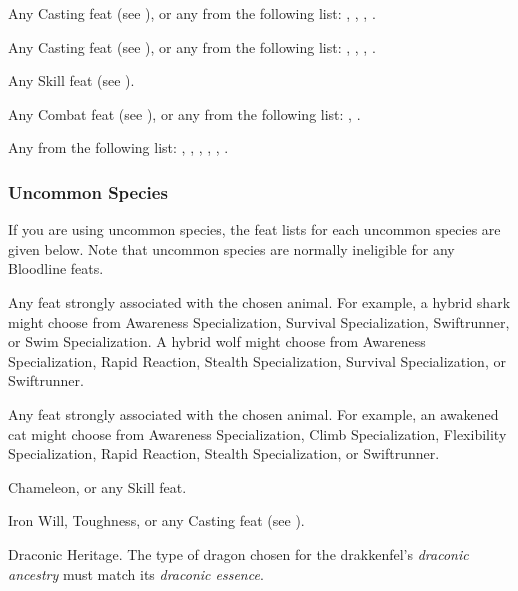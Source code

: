          Any Casting feat (see ), or any from the following list: , , , .

         Any Casting feat (see ), or any from the following list: , , , .

         Any Skill feat (see ).

         Any Combat feat (see ), or any from the following list: , .

         Any from the following list: , , , , , .

        \subsubsection{Uncommon Species}
            If you are using uncommon species, the feat lists for each uncommon species are given below.
            Note that uncommon species are normally ineligible for any Bloodline feats.

             Any feat strongly associated with the chosen animal. For example, a hybrid shark might choose from Awareness Specialization, Survival Specialization, Swiftrunner, or Swim Specialization. A hybrid wolf might choose from Awareness Specialization, Rapid Reaction, Stealth Specialization, Survival Specialization, or Swiftrunner.

             Any feat strongly associated with the chosen animal. For example, an awakened cat might choose from Awareness Specialization, Climb Specialization, Flexibility Specialization, Rapid Reaction, Stealth Specialization, or Swiftrunner.

             Chameleon, or any Skill feat.

             Iron Will, Toughness, or any Casting feat (see ).

             Draconic Heritage. The type of dragon chosen for the drakkenfel's \textit{draconic ancestry} must match its \textit{draconic essence}.

